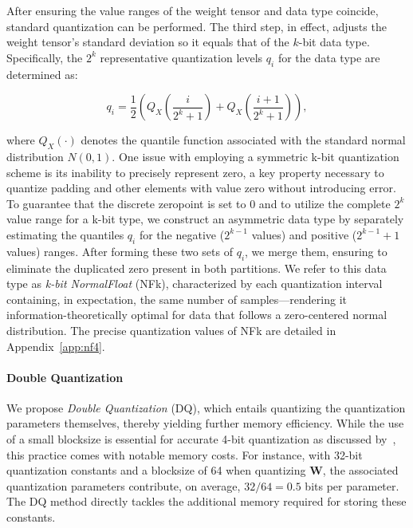 After ensuring the value ranges of the weight tensor and data type coincide, standard quantization can be performed. The third step, in effect, adjusts the weight tensor’s standard deviation so it equals that of the $k$-bit data type. Specifically, the $2^k$ representative quantization levels $q_i$ for the data type are determined as:

\begin{equation}
q_i  = \frac{1}{2}\left( Q_X\left(\frac{i}{2^k+1}\right) + Q_X\left(\frac{i+1}{2^k+1}\right)\right),
\end{equation}

where $Q_X(\cdot)$ denotes the quantile function associated with the standard normal distribution $N(0,1)$. One issue with employing a symmetric k-bit quantization scheme is its inability to precisely represent zero, a key property necessary to quantize padding and other elements with value zero without introducing error. To guarantee that the discrete zeropoint is set to $0$ and to utilize the complete $2^k$ value range for a k-bit type, we construct an asymmetric data type by separately estimating the quantiles $q_i$ for the negative ($2^{k-1}$ values) and positive ($2^{k-1} + 1$ values) ranges. After forming these two sets of $q_i$, we merge them, ensuring to eliminate the duplicated zero present in both partitions. We refer to this data type as \emph{k-bit NormalFloat} (NFk), characterized by each quantization interval containing, in expectation, the same number of samples—rendering it information-theoretically optimal for data that follows a zero-centered normal distribution. The precise quantization values of NFk are detailed in Appendix~\ref{app:nf4}.

\paragraph{Double Quantization{}} 
We propose \emph{Double Quantization} (DQ), which entails quantizing the quantization parameters themselves, thereby yielding further memory efficiency. While the use of a small blocksize is essential for accurate 4-bit quantization as discussed by~\citet{dettmers2022case}, this practice comes with notable memory costs. For instance, with 32-bit quantization constants and a blocksize of 64 when quantizing $\mathbf{W}$, the associated quantization parameters contribute, on average, $32/64 = 0.5$ bits per parameter. The DQ method directly tackles the additional memory required for storing these constants.

